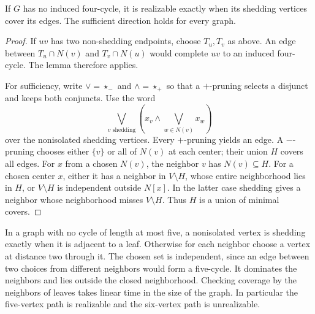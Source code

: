 \begin{theorem}
\label{core:thm:shedding-prunings}
If $G$ has no induced four-cycle, it is realizable exactly when its
shedding vertices cover its edges. The sufficient direction holds for
every graph.
\end{theorem}
\begin{proof}
If $uv$ has two non-shedding endpoints, choose $T_u,T_v$ as above.
An edge between $T_u\cap N(v)$ and $T_v\cap N(u)$ would complete $uv$
to an induced four-cycle. The lemma therefore applies.

For sufficiency, write $\lor=\star_-$ and $\land=\star_+$ so that a
$+$-pruning selects a disjunct and keeps both conjuncts. Use the word
\[
  \bigvee_{v\text{ shedding}}
     \left(x_v\land\bigvee_{w\in N(v)}x_w\right)
\]
over the nonisolated shedding vertices. Every $+$-pruning yields an
edge. A $-$-pruning chooses either $\{v\}$ or all of $N(v)$ at each
center; their union $H$ covers all edges. For $x$ from a chosen $N(v)$,
the neighbor $v$ has $N(v)\subseteq H$. For a chosen center $x$,
either it has a neighbor in $V\setminus H$, whose entire neighborhood
lies in $H$, or $V\setminus H$ is independent outside $N[x]$.
In the latter case shedding gives a neighbor whose neighborhood
misses $V\setminus H$. Thus $H$ is a union of minimal covers.
\end{proof}

In a graph with no cycle of length at most five, a nonisolated vertex
is shedding exactly when it is adjacent to a leaf. Otherwise for each
neighbor choose a vertex at distance two through it. The chosen set
is independent, since an edge between two choices from different
neighbors would form a five-cycle. It dominates the neighbors and
lies outside the closed neighborhood. Checking coverage by the
neighbors of leaves takes linear time in the size of the graph.
In particular the five-vertex path is realizable and the six-vertex
path is unrealizable.

